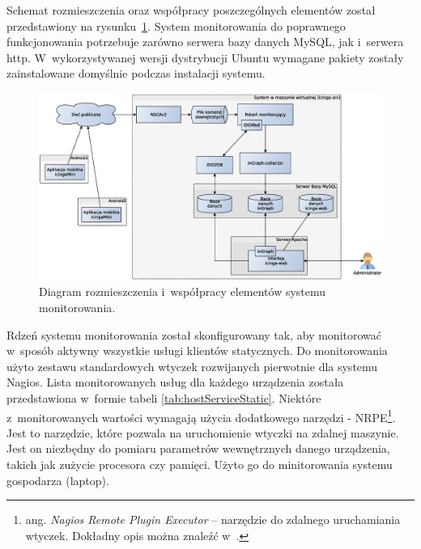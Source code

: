 Schemat rozmieszczenia oraz współpracy poszczególnych elementów został
przedstawiony na rysunku~\ref{fig:deployment}. System monitorowania do
poprawnego funkcjonowania potrzebuje zarówno serwera bazy danych
MySQL, jak i~serwera http. W~wykorzystywanej wersji dystrybucji Ubuntu
wymagane pakiety zostały zainstalowane domyślnie podczas instalacji
systemu.

\begin{figure}[ht]
  \caption{Diagram rozmieszczenia i~współpracy elementów systemu
    monitorowania.}
 \label{fig:deployment}
\includegraphics[width=1\textwidth]{img/deployment}
\end{figure}

Rdzeń systemu monitorowania został skonfigurowany tak, aby monitorować
w~sposób aktywny wszystkie usługi klientów statycznych. Do
monitorowania użyto zestawu standardowych wtyczek rozwijanych
pierwotnie dla systemu Nagios. Lista monitorowanych usług dla każdego
urządzenia została przedstawiona w~formie tabeli
\ref{tab:hostServiceStatic}. Niektóre z~monitorowanych wartości
wymagają użycia dodatkowego narzędzi - NRPE\footnote{ang. {\em Nagios
    Remote Plugin Executor} -- narzędzie do zdalnego uruchamiania
  wtyczek. Dokładny opis można znaleźć w~\cite{www:NRPE}.}. Jest to
narzędzie, które pozwala na uruchomienie wtyczki na zdalnej
maszynie. Jest on niezbędny do pomiaru parametrów wewnętrznych danego
urządzenia, takich jak zużycie procesora czy pamięci. Użyto go do
minitorowania systemu gospodarza (laptop).

